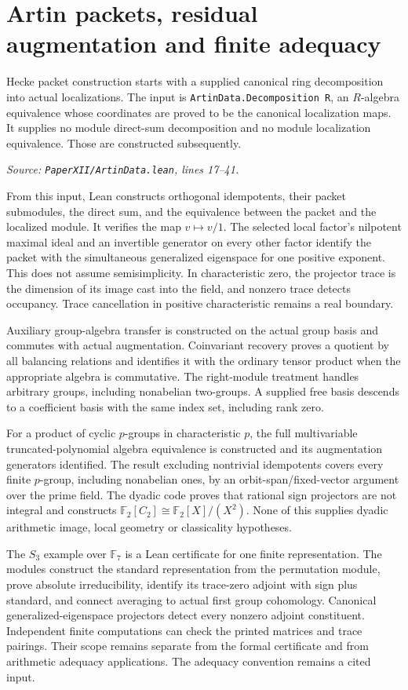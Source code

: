 \documentclass[11pt]{article}
\newcommand{\code}[1]{\nolinkurl{#1}}
\newcommand{\excerpt}[3]{\par\smallskip\textit{Source: \code{PaperXII/#1.lean}, lines #2--#3.}\par\VerbatimInput[fontsize=\scriptsize,breaklines=true,breakanywhere=true,numbers=left,numbersep=4pt,firstline=#2,lastline=#3,firstnumber=#2,frame=lines]{excerpts/#1.display.txt}\par}
\begin{document}
\section{Artin packets, residual augmentation and finite adequacy}
Hecke packet construction starts with a supplied canonical ring decomposition into actual localizations. The input is \code{ArtinData.Decomposition R}, an \(R\)-algebra equivalence whose coordinates are proved to be the canonical localization maps. It supplies no module direct-sum decomposition and no module localization equivalence. Those are constructed subsequently.
\excerpt{ArtinData}{17}{41}

From this input, Lean constructs orthogonal idempotents, their packet submodules, the direct sum, and the equivalence between the packet and the localized module. It verifies the map \(v\mapsto v/1\). The selected local factor's nilpotent maximal ideal and an invertible generator on every other factor identify the packet with the simultaneous generalized eigenspace for one positive exponent. This does not assume semisimplicity. In characteristic zero, the projector trace is the dimension of its image cast into the field, and nonzero trace detects occupancy. Trace cancellation in positive characteristic remains a real boundary.

Auxiliary group-algebra transfer is constructed on the actual group basis and commutes with actual augmentation. Coinvariant recovery proves a quotient by all balancing relations and identifies it with the ordinary tensor product when the appropriate algebra is commutative. The right-module treatment handles arbitrary groups, including nonabelian two-groups. A supplied free basis descends to a coefficient basis with the same index set, including rank zero.

For a product of cyclic \(p\)-groups in characteristic \(p\), the full multivariable truncated-polynomial algebra equivalence is constructed and its augmentation generators identified. The result excluding nontrivial idempotents covers every finite \(p\)-group, including nonabelian ones, by an orbit-span/fixed-vector argument over the prime field. The dyadic code proves that rational sign projectors are not integral and constructs \(\mathbb F_2[C_2]\cong\mathbb F_2[X]/(X^2)\). None of this supplies dyadic arithmetic image, local geometry or classicality hypotheses.

The \(S_3\) example over \(\mathbb F_7\) is a Lean certificate for one finite representation. The modules construct the standard representation from the permutation module, prove absolute irreducibility, identify its trace-zero adjoint with sign plus standard, and connect averaging to actual first group cohomology. Canonical generalized-eigenspace projectors detect every nonzero adjoint constituent. Independent finite computations can check the printed matrices and trace pairings. Their scope remains separate from the formal certificate and from arithmetic adequacy applications. The adequacy convention remains a cited input.
\end{document}
